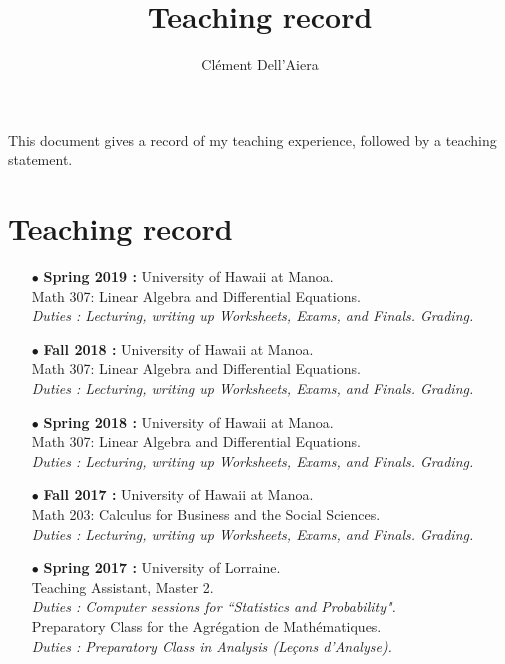 \documentclass[a4paper]{article}
\title{Teaching record}
\date{}
\author{ Clément Dell'Aiera}
\begin{document}
\maketitle

This document gives a record of my teaching experience, followed by a teaching statement.
 
\section{Teaching record}

\begin{itemize}

\item[$\bullet$] \textbf{ Spring 2019 :} University of Hawaii at Manoa.\\
					Math 307: Linear Algebra and Differential Equations.\\
					\textit{Duties : Lecturing, writing up Worksheets, Exams, and Finals. Grading.}\\

\item[$\bullet$] \textbf{ Fall 2018 :} University of Hawaii at Manoa.\\
					Math 307: Linear Algebra and Differential Equations.\\
					\textit{Duties : Lecturing, writing up Worksheets, Exams, and Finals. Grading.}\\

\item[$\bullet$] \textbf{ Spring 2018 :} University of Hawaii at Manoa.\\
					 Math 307: Linear Algebra and Differential Equations.\\
					\textit{Duties : Lecturing, writing up Worksheets, Exams, and Finals. Grading.}\\

\item[$\bullet$] \textbf{ Fall 2017 :} University of Hawaii at Manoa.\\
				 	Math 203: Calculus for Business and the Social Sciences.\\
					\textit{Duties : Lecturing, writing up Worksheets, Exams, and Finals. Grading.}\\

\item[$\bullet$] \textbf{ Spring 2017 :} University of Lorraine.\\
					Teaching Assistant, Master 2. \\
					\textit{Duties : Computer sessions for ``Statistics and Probability".}\\
					Preparatory Class for the Agrégation de Mathématiques.\\
					\textit{Duties : Preparatory Class in Analysis (Le\c{c}ons d'Analyse).}\\
	

\end{itemize}
\end{document}
